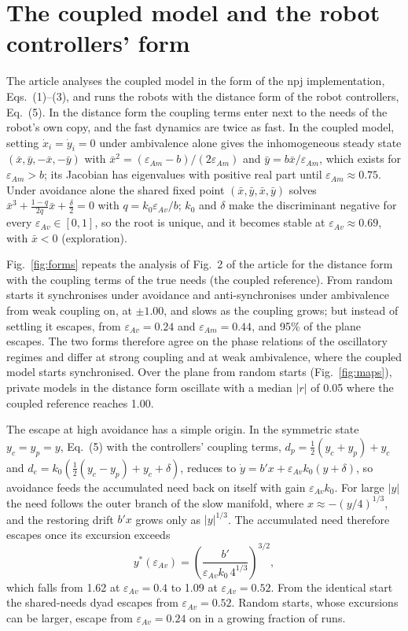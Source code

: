\documentclass[journal]{IEEEtran}
\newcommand{\eav}{\varepsilon_{Av}}
\newcommand{\eam}{\varepsilon_{Am}}
\begin{document}
\section{The coupled model and the robot controllers' form}
\label{sec:forms}
The article analyses the coupled model in the form of the npj implementation, Eqs.~(1)--(3), and runs the robots with the distance form of the robot controllers, Eq.~(5). In the distance form the coupling terms enter next to the needs of the robot's own copy, and the fast dynamics are twice as fast. In the coupled model, setting $\dot{x}_i=\dot{y}_i=0$ under ambivalence alone gives the inhomogeneous steady state $(\bar x,\bar y,-\bar x,-\bar y)$ with $\bar x^2=(\eam-b)/(2\eam)$ and $\bar y=b\bar x/\eam$, which exists for $\eam>b$; its Jacobian has eigenvalues with positive real part until $\eam\approx0.75$. Under avoidance alone the shared fixed point $(\bar x,\bar y,\bar x,\bar y)$ solves $\bar x^3+\frac{1-q}{2q}\bar x+\frac{\delta}{2}=0$ with $q=k_0\eav/b$; $k_0$ and $\delta$ make the discriminant negative for every $\eav\in[0,1]$, so the root is unique, and it becomes stable at $\eav\approx0.69$, with $\bar x<0$ (exploration).

Fig.~\ref{fig:forms} repeats the analysis of Fig.~2 of the article for the distance form with the coupling terms of the true needs (the coupled reference). From random starts it synchronises under avoidance and anti-synchronises under ambivalence from weak coupling on, at $\pm1.00$, and slows as the coupling grows; but instead of settling it escapes, from $\eav=0.24$ and $\eam=0.44$, and 95\% of the plane escapes. The two forms therefore agree on the phase relations of the oscillatory regimes and differ at strong coupling and at weak ambivalence, where the coupled model starts synchronised. Over the plane from random starts (Fig.~\ref{fig:maps}), private models in the distance form oscillate with a median $|r|$ of 0.05 where the coupled reference reaches 1.00.

The escape at high avoidance has a simple origin. In the symmetric state $y_c=y_p=y$, Eq.~(5) with the controllers' coupling terms, $d_p=\tfrac12(y_c+y_p)+y_c$ and $d_e=k_0(\tfrac12(y_c-y_p)+y_c+\delta)$, reduces to $\dot{y}=b'x+\eav k_0 (y+\delta)$, so avoidance feeds the accumulated need back on itself with gain $\eav k_0$. For large $|y|$ the need follows the outer branch of the slow manifold, where $x\approx-(y/4)^{1/3}$, and the restoring drift $b'x$ grows only as $|y|^{1/3}$. The accumulated need therefore escapes once its excursion exceeds
\begin{equation}
y^*(\eav) = \left(\frac{b'}{\eav k_0\, 4^{1/3}}\right)^{3/2},
\end{equation}
which falls from 1.62 at $\eav=0.4$ to 1.09 at $\eav=0.52$. From the identical start the shared-needs dyad escapes from $\eav=0.52$. Random starts, whose excursions can be larger, escape from $\eav=0.24$ on in a growing fraction of runs.
\end{document}
